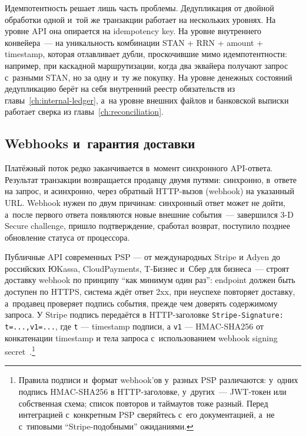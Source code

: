 Идемпотентность решает лишь часть проблемы. Дедупликация
от двойной обработки одной и~той же транзакции работает
на нескольких уровнях. На уровне API она опирается
на idempotency key. На уровне внутреннего конвейера~---
на уникальность комбинации STAN + RRN + amount + timestamp,
которая отлавливает дубли, проскочившие мимо идемпотентности:
например, при каскадной маршрутизации, когда два эквайера
получают запрос с~разными STAN, но за одну и~ту же покупку.
На уровне денежных состояний дедупликацию берёт на себя
внутренний реестр обязательств из главы~\ref{ch:internal-ledger},
а~на уровне внешних файлов и банковской выписки работает
сверка из главы~\ref{ch:reconciliation}.

\subsection*{Webhooks и~гарантия доставки}

Платёжный поток редко заканчивается в~момент синхронного
API-ответа. Результат транзакции возвращается продавцу
двумя путями: синхронно, в~ответе на запрос, и асинхронно,
через обратный HTTP-вызов (webhook) на указанный URL.
Webhook нужен по двум причинам: синхронный ответ может
не дойти, а~после первого ответа появляются
новые внешние события~--- завершился 3-D Secure challenge,
пришло подтверждение, сработал возврат, поступило позднее
обновление статуса от процессора.

Публичные API современных PSP --- от международных Stripe и
Adyen до российских ЮKassa, CloudPayments, T-Бизнес и~Сбер
для бизнеса~--- строят доставку webhook по принципу
\enquote{как минимум один раз}: endpoint должен быть доступен
по HTTPS, система ждёт ответ 2xx, при неуспехе повторяет
доставку, а~продавец проверяет подпись события, прежде чем
доверять содержимому запроса. У Stripe подпись
передаётся в HTTP-заголовке \texttt{Stripe-Signature: t=...,v1=...},
где \texttt{t} --- timestamp подписи, а \texttt{v1} ---
HMAC-SHA256 от конкатенации timestamp и тела запроса
с~использованием webhook signing
secret~\cite{stripe-webhooks}.\footnote{Правила подписи и~формат
webhook'ов у~разных PSP различаются: у~одних подпись HMAC-SHA256
в HTTP-заголовке, у~других~--- JWT-токен или собственная схема;
список повторов и таймаутов тоже разный. Перед интеграцией
с~конкретным PSP сверяйтесь с~его документацией, а~не с~типовыми
\enquote{Stripe-подобными} ожиданиями.}

